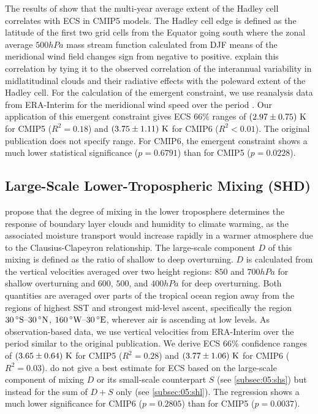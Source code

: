 The results of \textcite{Lipat2017} show that the multi-year average extent of
the Hadley cell correlates with \acs{ECS} in \acs{CMIP}5 models. The Hadley
cell edge is defined as the latitude of the first two grid cells from the
Equator going south where the zonal average $500 \unit{hPa}$ mass stream
function calculated from \ac{DJF} means of the meridional wind field changes
sign from negative to positive. \Textcite{Lipat2017} explain this correlation
by tying it to the observed correlation of the interannual variability in
midlatitudinal clouds and their radiative effects with the poleward extent of
the Hadley cell. For the calculation of the emergent constraint, we use
reanalysis data from ERA-Interim \autocite{Dee2011} for the meridional wind
speed over the period . Our application of this emergent
constraint gives \ac{ECS} $66 \unit{\%}$ ranges of
$\pmrangeunit{2.97}{0.75}{K}$ for \acs{CMIP}5 ($R^2 = 0.18$) and
$\pmrangeunit{3.75}{1.11}{K}$ for \acs{CMIP}6 ($R^2 < 0.01$). The original
publication does not specify  range. For \acs{CMIP}6, the emergent
constraint shows a much lower statistical significance ($p = 0.6791$) than for
\acs{CMIP}5 ($p = 0.0228$).


\subsection{Large-Scale Lower-Tropospheric Mixing (SHD)}
\label{subsec:05:shd}

\textcite{Sherwood2014} propose that the degree of mixing in the lower
troposphere determines the response of boundary layer clouds and humidity to
climate warming, as the associated moisture transport would increase rapidly in
a warmer atmosphere due to the Clausius-Clapeyron relationship. The large-scale
component $D$ of this mixing is defined as the ratio of shallow to deep
overturning. $D$ is calculated from the vertical velocities averaged over two
height regions: $850$ and $700 \unit{hPa}$ for shallow overturning and $600$,
$500$, and $400 \unit{hPa}$ for deep overturning. Both quantities are averaged
over parts of the tropical ocean region away from the regions of highest
\ac{SST} and strongest mid-level ascent, specifically the region $\range{30
  \unit{\degree S}}{30 \unit{\degree N}}$, $\range{160 \unit{\degree W}}{30
  \unit{\degree E}}$, wherever air is ascending at low levels. As
observation-based data, we use vertical velocities from ERA-Interim
\autocite{Dee2011} over the period  similar to the original
publication. We derive \ac{ECS} $66 \unit{\%}$ confidence ranges of
$\pmrangeunit{3.65}{0.64}{K}$ for \acs{CMIP}5 ($R^2 = 0.28$) and
$\pmrangeunit{3.77}{1.06}{K}$ for \acs{CMIP}6 ($R^2 = 0.03$).
\Textcite{Sherwood2014} do not give a best estimate for \ac{ECS} based on the
large-scale component of mixing $D$ or its small-scale counterpart $S$ (see
\cref{subsec:05:shs}) but instead for the sum of $D + S$ only (see
\cref{subsec:05:shl}). The regression shows a much lower significance for
\acs{CMIP}6 ($p = 0.2805$) than for \acs{CMIP}5 ($p = 0.0037$).

